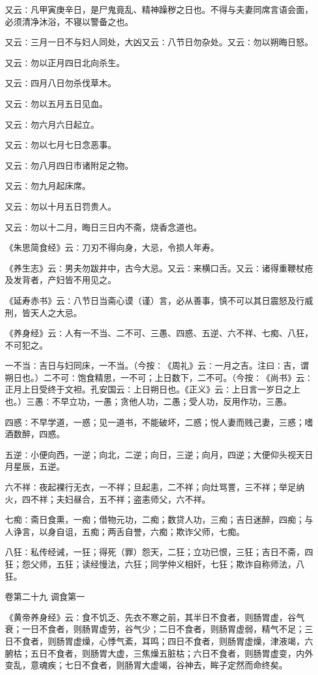\documentclass[a4paper,12pt,UTF8,twoside]{ctexbook}
\begin{document}
又云∶凡甲寅庚辛日，是尸鬼竟乱、精神躁秽之日也。不得与夫妻同席言语会面，必须清净沐浴，不寝以警备之也。

又云∶三月一日不与妇人同处，大凶又云∶八节日勿杂处。又云∶勿以朔晦日怒。

又云∶勿以正月四日北向杀生。

又云∶四月八日勿杀伐草木。

又云∶勿以五月五日见血。

又云∶勿六月六日起立。

又云∶勿以七月七日念恶事。

又云∶勿八月四日市诸附足之物。

又云∶勿九月起床席。

又云∶勿以十月五日罚贵人。

又云∶勿以十二月，晦日三日内不斋，烧香念道也。

《朱思简食经》云∶刀刃不得向身，大忌，令损人年寿。

《养生志》云∶男夫勿跋井中，古今大忌。又云∶来横口舌。又云∶诸得重鞭杖疮及发背者，产妇皆不用见之。

《延寿赤书》云∶八节日当斋心谟（谨）言，必从善事，慎不可以其日震怒及行威刑，皆天人之大忌。

《养身经》云∶人有一不当、二不可、三愚、四惑、五逆、六不祥、七痴、八狂，不可犯之。

一不当∶吉日与妇同床，一不当。（今按∶《周礼》云∶一月之吉。注曰∶吉，谓朔日也。）二不可∶饱食精思，一不可；上日数下，二不可。（今按∶《尚书》云∶正月上日受终于文袒。孔安国云∶上日朔日也。《正义》云∶上日言一岁日之上也。）三愚∶不早立功，一愚；贪他人功，二愚；受人功，反用作功，三愚。

四惑∶不早学道，一惑；见一道书，不能破坏，二惑；悦人妻而贱己妻，三惑；嗜酒数醉，四惑。

五逆∶小便向西，一逆；向北，二逆；向日，三逆；向月，四逆；大便仰头视天日月星辰，五逆。

六不祥∶夜起裸行无衣，一不祥；旦起恚，二不祥；向灶骂詈，三不祥；举足纳火，四不祥；夫妇昼合，五不祥；盗恚师父，六不祥。

七痴∶斋日食熏，一痴；借物元功，二痴；数贷人功，三痴；吉日迷醉，四痴；与人诤言，以身自诅，五痴；两舌自誉，六痴；欺诈父师，七痴。

八狂∶私传经诫，一狂；得死（罪）怨天，二狂；立功已恨，三狂；吉日不斋，四狂；怨父师，五狂；读经慢法，六狂；同学仲义相奸，七狂；欺诈自称师法，八狂。




卷第二十九
调食第一

《黄帝养身经》云∶食不饥乏、先衣不寒之前，其半日不食者，则肠胃虚，谷气衰；一日不食者，则肠胃虚劳，谷气少；二日不食者，则肠胃虚弱，精气不足；三日不食者，则肠胃虚燥，心悸气紊，耳鸣；四日不食者，则肠胃虚燥，津液竭，六腑枯；五日不食者，则肠胃大虚，三焦燥五脏枯；六日不食者，则肠胃虚变，内外变乱，意魂疾；七日不食者，则肠胃大虚竭，谷神去，眸子定然而命终矣。
\end{document}

